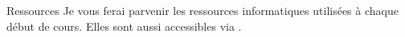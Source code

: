 \begin{frame}{Ressources}
  Je vous ferai parvenir les ressources informatiques utilisées à chaque début de cours.
  Elles sont aussi accessibles via .
\end{frame}
